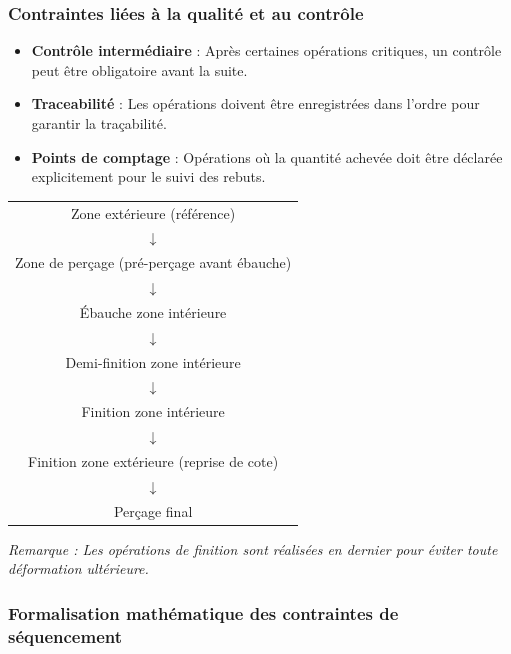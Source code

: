 \documentclass{article}
\begin{document}
\subsubsection{Contraintes liées à la qualité et au contrôle}

\begin{itemize}
    \item \textbf{Contrôle intermédiaire} : Après certaines opérations critiques, un contrôle peut être obligatoire avant la suite.
    \item \textbf{Traceabilité} : Les opérations doivent être enregistrées dans l'ordre pour garantir la traçabilité.
    \item \textbf{Points de comptage} : Opérations où la quantité achevée doit être déclarée explicitement pour le suivi des rebuts.
\end{itemize}

\begin{tcolorbox}[colback=yellow!10!white, colframe=yellow!50!black, title=Exemple : Graphe d'antériorité pour une pièce de structure]
\begin{center}
\begin{tabular}{c}
Zone extérieure (référence) \\
$\downarrow$ \\
Zone de perçage (pré-perçage avant ébauche) \\
$\downarrow$ \\
Ébauche zone intérieure \\
$\downarrow$ \\
Demi-finition zone intérieure \\
$\downarrow$ \\
Finition zone intérieure \\
$\downarrow$ \\
Finition zone extérieure (reprise de cote) \\
$\downarrow$ \\
Perçage final \\
\end{tabular}
\end{center}
\textit{Remarque : Les opérations de finition sont réalisées en dernier pour éviter toute déformation ultérieure.}
\end{tcolorbox}

\subsubsection{Formalisation mathématique des contraintes de séquencement}
\end{document}
